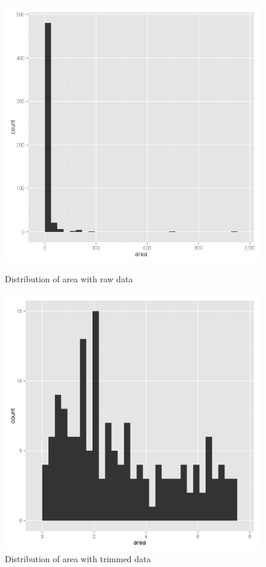 \documentclass{article}
\begin{document}
\begin{figure}[htb]
  \begin{minipage}[b]{0.45\linewidth}
  \centering
  \includegraphics[width=\textwidth]{figures/badhist.png}
  \caption{Distribution of area with raw data}
\end{minipage}
\hspace{0.5cm}
  \begin{minipage}[b]{0.45\linewidth}
  \centering
  \includegraphics[width=\textwidth]{figures/goodhist.png}
  \caption{Distribution of area with trimmed data}
\end{minipage}
\end{figure}
\end{document}
